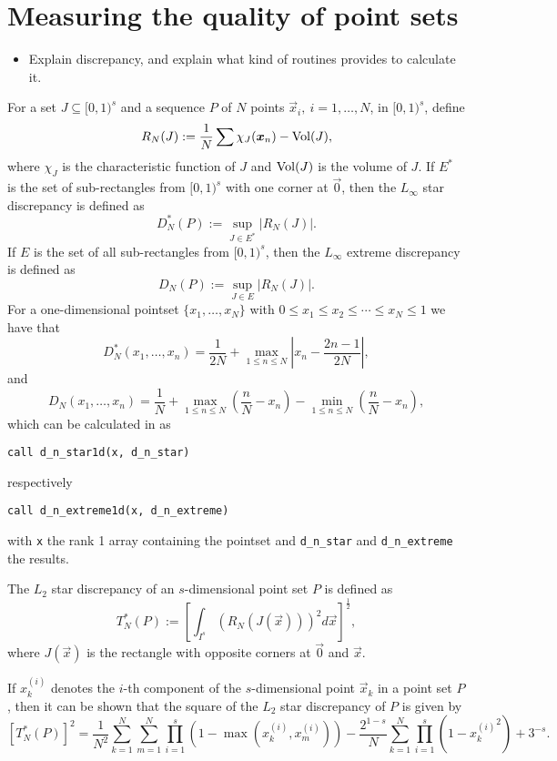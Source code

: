 \chapter{Measuring the quality of point sets}

\begin{itemize}
\item Explain discrepancy, and explain what kind of routines \qmcpack{} provides
      to calculate it.
\end{itemize}

For a set $J \subseteq [0,1)^s$ and a sequence $P$ of $N$ points $\vec{x}_i,\
i=1,\ldots,N$, in $[0,1)^s$, define
\begin{equation} \label{eq:local_discrepancy}
R_N(J) := \frac{1}{N}\sum{\chi_J(\boldsymbol{x}_n)}-\mathrm{Vol}(J),
\end{equation}
where $\chi_J$ is the characteristic function of $J$ and $\mathrm{Vol}(J)$ is the volume
of $J$.
If $E^*$ is the set of sub-rectangles from $[0,1)^s$ with one corner at $\vec{0}$, then the
$L_{\infty}$ star discrepancy is defined as
\[
D_N^*(P) := \sup_{J \in E^*}|R_N(J)|.
\]
If $E$ is the set of all sub-rectangles from $[0,1)^s$, then the $L_{\infty}$
extreme discrepancy is defined as
\[
D_N(P) := \sup_{J \in E}|R_N(J)|.
\]
For a one-dimensional pointset $\{x_1,\ldots,x_N\}$ with $0 \leq x_1 \leq x_2 \leq \cdots \leq x_N \leq 1$ we have that
\[
D_N^*(x_1,\ldots,x_n) = \frac{1}{2N} + \max_{1 \leq n \leq N} \left| x_n -
\frac{2n-1}{2N}\right|,
\]
and
\[
D_N(x_1,\ldots,x_n) = \frac{1}{N}
                        + \max_{1\leq n \leq N}\left(\frac{n}{N}-x_n\right)
                        - \min_{1\leq n \leq N}\left(\frac{n}{N}-x_n\right),
\]
which can be calculated in \qmcpack{} as
\begin{lstlisting}
call d_n_star1d(x, d_n_star)
\end{lstlisting}
respectively
\begin{lstlisting}
call d_n_extreme1d(x, d_n_extreme)
\end{lstlisting}
with \verb!x! the rank 1 array containing the pointset and \verb!d_n_star! and \verb!d_n_extreme! the results.

The $L_2$ star discrepancy of an $s$-dimensional point set $P$ is defined as
\[
T_N^*(P) := \left[ \int_{I^s} \left( R_N(J(\vec{x}))\right)^2 d\vec{x}\right]^\frac{1}{2},
\]
where $J(\vec{x})$ is the rectangle with opposite corners at $\vec{0}$ and
$\vec{x}$.

If $x_k^{(i)}$ denotes the $i$-th component of the
$s$-dimensional point $\vec{x}_k$ in a point set $P$, then it can be shown
\cite{warnock72} that the square of the $L_2$ star discrepancy of $P$ is given
by
\begin{equation}
\label{eq:def T_N}
[T_N^*(P)]^2 =
  \frac{1}{N^2}\sum_{k=1}^N\sum_{m=1}^N\prod_{i=1}^s\left(1-\max(x_k^{(i)},x_m^{(i)})\right)
  - \frac{2^{1-s}}{N} \sum_{k=1}^{N} \prod_{i=1}^s\left(1-{x_k^{(i)}}^2\right)
  + 3^{-s}.
\end{equation}

